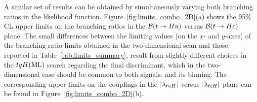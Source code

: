 A similar set of results can be obtained by simultaneously varying both branching ratios in the likelihood function.
Figure~\ref{fig:limits_combo_2D}(a) shows the 95\% CL upper limits on the branching ratios in the $\mathcal{B}(t\to Hu)$ versus $\mathcal{B}(t\to Hc)$ plane. 
The small differences between the limiting values (on the $x$- and $y$-axes) of the branching ratio limits obtained in the two-dimensional scan and 
those reported in Table~\ref{tab:limits_summary}, result from slightly different choices in the $tqH(\mathrm{ML})$ search  
regarding the final discriminant, which in the two-dimensional case should be common to both signals, and its binning.
The corresponding upper limits on the couplings in the $|\lambda_{tuH}|$ versus $|\lambda_{tcH}|$ plane can be found in Figure~\ref{fig:limits_combo_2D}(b).


